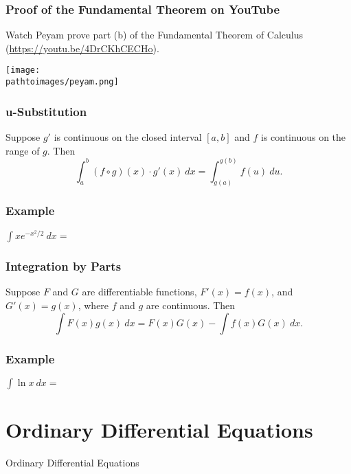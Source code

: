 \documentclass{beamer}
\newcommand{\pathtoimages}{/Users/charlesrambo/Desktop/Bootcamp24/Images}
\begin{document}
\begin{frame}
\frametitle{Proof of the Fundamental Theorem on YouTube}
Watch Peyam prove part (b) of the Fundamental Theorem of Calculus  (\url{https://youtu.be/4DrCKhCECHo}).
\begin{center}
\texttt{[image: \\pathtoimages/peyam.png]}
\end{center}
\end{frame}

\begin{frame}
\frametitle{u-Substitution} 

\begin{Theorem}[u-Substitution]
Suppose $g'$ is continuous on the closed interval $[a, b]$ and $f$ is continuous on the range of $g$. Then
$$
\int_a^b (f \circ g)(x)\cdot g'(x)\ dx = \int_{g(a)}^{g(b)} f(u)\ du.
$$
\end{Theorem}
\end{frame}

\begin{frame}[t]
\frametitle{Example}
\begin{Example}
$\displaystyle \int x e^{-x^2/2}\ dx =$
\end{Example}

\end{frame}

\begin{frame}
\frametitle{Integration by Parts}

\begin{Theorem}
Suppose $F$ and $G$ are differentiable functions, $F'(x) = f(x)$, and $G'(x) = g(x)$, where $f$ and $g$ are continuous. Then
$$
\int F(x) g(x)\ dx = F(x) G(x) - \int f(x) G(x)\ dx.
$$
\end{Theorem}
\end{frame}

\begin{frame}[t]
\frametitle{Example}
\begin{Example}
$\displaystyle\int \ln x\ dx = $
\end{Example}
\end{frame}

\section{Ordinary Differential Equations}

\begin{frame}
\begin{center}
\Huge Ordinary Differential Equations
\end{center}
\end{frame}
\end{document}
